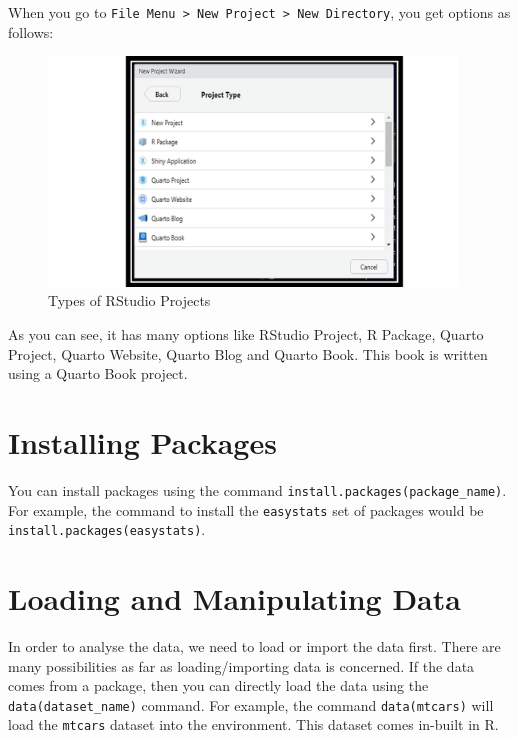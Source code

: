 \documentclass[
  letterpaper,
  paper =a4,
  twoside,
  openright,
  headsepline,
  footsepline,
  listof = totocnumbered,
  chapterprefix = true,
  firstiscover]{scrbook}
\begin{document}
When you go to
\texttt{File\ Menu\ \textgreater{}\ New\ Project\ \textgreater{}\ New\ Directory},
you get options as follows:

\begin{figure}

{\centering \includegraphics[width=4.27in,height=\textheight]{images/New_Project.png}

}

\caption{\label{fig-rstudio-project}Types of RStudio Projects}

\end{figure}

As you can see, it has many options like RStudio Project, R Package,
Quarto Project, Quarto Website, Quarto Blog and Quarto Book. This book
is written using a Quarto Book project.

\hypertarget{installing-packages}{%
\section{Installing Packages}\label{installing-packages}}

You can install packages using the command
\texttt{install.packages(package\_name)}. For example, the command to
install the \texttt{easystats} set of packages would be
\texttt{install.packages(easystats)}.

\hypertarget{loading-and-manipulating-data}{%
\section{Loading and Manipulating
Data}\label{loading-and-manipulating-data}}

In order to analyse the data, we need to load or import the data first.
There are many possibilities as far as loading/importing data is
concerned. If the data comes from a package, then you can directly load
the data using the \texttt{data(dataset\_name)} command. For example,
the command \texttt{data(mtcars)} will load the \texttt{mtcars} dataset
into the environment. This dataset comes in-built in R.
\end{document}
